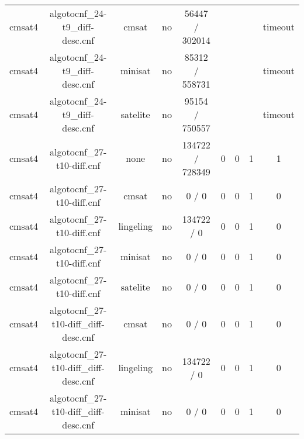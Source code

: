 \begin{appendices}
\begin{table}[p]
\begin{center}
\begin{tabular}{l|cccccccc}
  cmsat4                         & algotocnf\_24-t9\_diff-desc.cnf & cmsat      & no    & 56447 / 302014 &           &           &            & timeout \\ %
  cmsat4                         & algotocnf\_24-t9\_diff-desc.cnf & minisat    & no    & 85312 / 558731 &           &           &            & timeout \\ %
  cmsat4                         & algotocnf\_24-t9\_diff-desc.cnf & satelite   & no    & 95154 / 750557 &           &           &            & timeout \\ %
  cmsat4                         & algotocnf\_27-t10-diff.cnf     & none       & no    & 134722 / 728349 & 0         & 0         & 1          & 1 \\ %
  cmsat4                         & algotocnf\_27-t10-diff.cnf     & cmsat      & no    & 0 / 0      & 0         & 0         & 1          & 0 \\ %
  cmsat4                         & algotocnf\_27-t10-diff.cnf     & lingeling  & no    & 134722 / 0 & 0         & 0         & 1          & 0 \\ %
  cmsat4                         & algotocnf\_27-t10-diff.cnf     & minisat    & no    & 0 / 0      & 0         & 0         & 1          & 0 \\ %
  cmsat4                         & algotocnf\_27-t10-diff.cnf     & satelite   & no    & 0 / 0      & 0         & 0         & 1          & 0 \\ %
  cmsat4                         & algotocnf\_27-t10-diff\_diff-desc.cnf & cmsat      & no    & 0 / 0      & 0         & 0         & 1          & 0 \\ %
  cmsat4                         & algotocnf\_27-t10-diff\_diff-desc.cnf & lingeling  & no    & 134722 / 0 & 0         & 0         & 1          & 0 \\ %
  cmsat4                         & algotocnf\_27-t10-diff\_diff-desc.cnf & minisat    & no    & 0 / 0      & 0         & 0         & 1          & 0 \\ %

\end{tabular}
\end{center}
\end{table}
\end{appendices}
